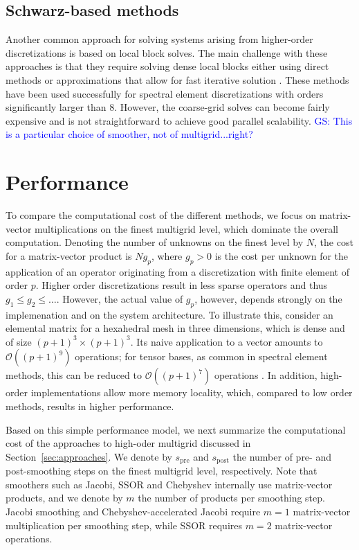 \documentclass[smallcondensed,final]{svjour3}     %
\newcommand{\gsnote}[1]{\textcolor{blue}{GS: #1}}
\begin{document}
\subsection{Schwarz-based methods}\label{subsec:schwarz}
Another common approach for solving systems arising from higher-order
discretizations is based on local block solves.  The main challenge
with these approaches is that they require solving dense local blocks
either using direct methods or approximations that allow for fast
iterative solution \cite{LottesFischer05,FischerLottes05}. These
methods have been used successfully for spectral element
discretizations with orders significantly larger than 8. However, the
coarse-grid solves can become fairly expensive and is not
straightforward to achieve good parallel scalability. \gsnote{This is
  a particular choice of smoother, not of multigrid...right?}




\section{Performance}
To compare the computational cost of the different methods, we focus
on matrix-vector multiplications on the finest multigrid level, which
dominate the overall computation. Denoting the number of unknowns on
the finest level by $N$, the cost for a matrix-vector product is
$Ng_p$, where $g_p>0$ is the cost per unknown for the application of
an operator originating from a discretization with finite element of
order $p$. Higher order discretizations result in less sparse
operators and thus $g_1\le g_2\le \ldots$. However, the actual value
of $g_p$, however, depends strongly on the implemenation and on the
system architecture. To illustrate this, consider an elemental matrix
for a hexahedral mesh in three dimensions, which is dense and of size
$(p+1)^3\times (p+1)^3$. Its naive application to a vector amounts to
$\mathcal O((p+1)^9)$ operations; for tensor bases, as common in
spectral element methods, this can be reduced to $\mathcal O((p+1)^7)$
operations \cite{DevilleFischerMund02}. In addition, high-order
implementations allow more memory locality, which, compared to low
order methods, results in higher performance.

Based on this simple performance model, we next summarize the
computational cost of the approaches to high-oder multigrid discussed
in Section~\ref{sec:approaches}. We denote by $s_\text{pre}$ and
$s_\text{post}$ the number of pre- and post-smoothing steps on the
finest multigrid level, respectively. Note that smoothers such as
Jacobi, SSOR and Chebyshev internally use matrix-vector products, and
we denote by $m$ the number of products per smoothing step.  Jacobi
smoothing and Chebyshev-accelerated Jacobi require $m=1$ matrix-vector
multiplication per smoothing step, while SSOR requires $m=2$
matrix-vector operations.
\end{document}
